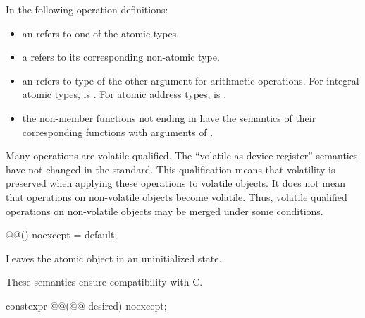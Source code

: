 \pnum
In the following operation definitions:

\begin{itemize}
\item an  refers to one of the atomic types.
\item a  refers to its corresponding non-atomic type.
\item an  refers to type of the other argument for arithmetic operations. For
integral atomic types,  is . For atomic address types,  is
.
\item the non-member functions not ending in  have the semantics of their
corresponding  functions with  arguments of
.
\end{itemize}

\pnum
\begin{note} Many operations are volatile-qualified. The ``volatile as device register''
semantics have not changed in the standard. This qualification means that volatility is
preserved when applying these operations to volatile objects. It does not mean that
operations on non-volatile objects become volatile. Thus, volatile qualified operations
on non-volatile objects may be merged under some conditions. \end{note}

%
%
%
\begin{itemdecl}
@@() noexcept = default;
\end{itemdecl}

\begin{itemdescr}
\pnum
\effects
Leaves the atomic object in an uninitialized state.
\begin{note}
These semantics ensure compatibility with C.
\end{note}
\end{itemdescr}

%
%
%
\begin{itemdecl}
constexpr @@(@@ desired) noexcept;
\end{itemdecl}

